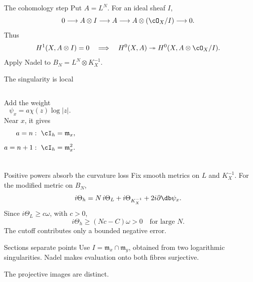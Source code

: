 \begin{frame}{The cohomology step}
Put \(A=L^N\). For an ideal sheaf \(I\),
\[
0\longrightarrow A\otimes I\longrightarrow A
\longrightarrow A\otimes(\cO_X/I)\longrightarrow0.
\]
Thus
\[
H^1(X,A\otimes I)=0
\quad\Longrightarrow\quad
H^0(X,A)\twoheadrightarrow H^0(X,A\otimes\cO_X/I).
\]
Apply Nadel to \(B_N=L^N\otimes K_X^{-1}\).
\end{frame}

\begin{frame}{The singularity is local}
\begin{columns}[c]
\centering
{}
Add the weight
\[
\psi_x=a\chi(z)\log|z|.
\]
Near \(x\), it gives
\[
\begin{aligned}
a=n &: \ \cI_h=\mathfrak m_x,\\[5pt]
a=n+1 &: \ \cI_h=\mathfrak m_x^2.
\end{aligned}
\]
\end{columns}
\end{frame}

\begin{frame}{Positive powers absorb the curvature loss}
Fix smooth metrics on \(L\) and \(K_X^{-1}\).
For the modified metric on \(B_N\),
\[
i\Theta_h
=N\,i\Theta_L+i\Theta_{K_X^{-1}}+2i\partial\db\psi_x.
\]
Since \(i\Theta_L\ge c\omega\), with \(c>0\),
\[
\boxed{i\Theta_h\ge(Nc-C)\omega>0\quad\text{for large }N.}
\]
The cutoff contributes only a bounded negative error.
\end{frame}

\begin{frame}{Sections separate points}
Use \(I=\mathfrak m_x\cap\mathfrak m_y\), obtained from two logarithmic singularities.
Nadel makes evaluation onto both fibres surjective.
\begin{center}
\end{center}
The projective images are distinct.
\end{frame}

